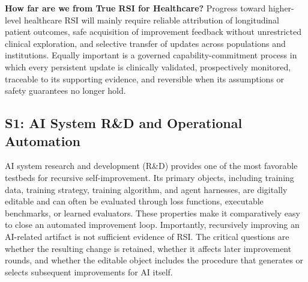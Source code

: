 \begin{tcolorbox}[
   width=\linewidth,
   colback=gray!7,
   colframe=gray!45,
   boxrule=0.9pt,
   arc=2mm,
   outer arc=2mm,
   left=7pt,
   right=7pt,
   top=5pt,
   bottom=5pt,
   boxsep=0pt,
   before skip=5pt,
   after skip=5pt
]
\textbf{How far are we from True RSI for Healthcare?}
Progress toward higher-level healthcare RSI will mainly require reliable attribution of longitudinal patient outcomes, safe acquisition of improvement feedback without unrestricted clinical exploration, and selective transfer of updates across populations and institutions. Equally important is a governed capability-commitment process in which every persistent update is clinically validated, prospectively monitored, traceable to its supporting evidence, and reversible when its assumptions or safety guarantees no longer hold.
\end{tcolorbox}







\iffalse

\subsection{S1: AI System R\&D and Operational Automation}
\label{subsec:s1-ai-rd}


AI system research and development (R\&D) provides one of the most favorable testbeds for recursive self-improvement. Its primary objects, including training data, training strategy, training algorithm, and agent harnesses, are digitally editable and can often be evaluated through loss functions, executable benchmarks, or learned evaluators. 
These properties make it comparatively easy to close an automated improvement loop. 
Importantly, recursively improving an AI-related artifact is not sufficient evidence of RSI. The critical questions are whether the resulting change is retained, whether it affects later improvement rounds, and whether the editable object includes the procedure that generates or selects subsequent improvements for AI itself.


